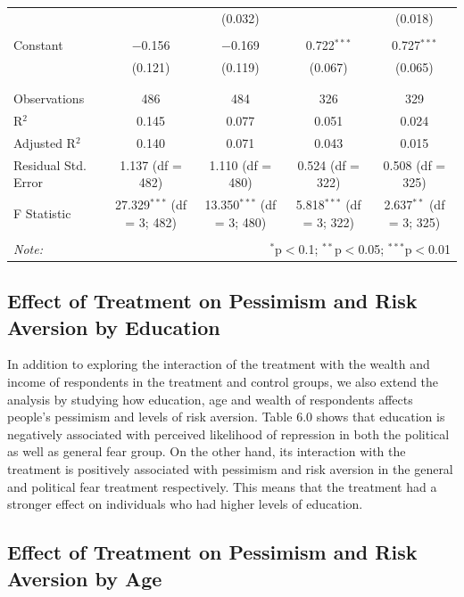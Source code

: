 \documentclass{article}
\begin{document}
\begin{table}[!htbp]
\begin{tabular}{@{\extracolsep{5pt}}lcccc}
  &  & (0.032) &  & (0.018) \\ 
  & & & & \\ 
 Constant & $-$0.156 & $-$0.169 & 0.722$^{***}$ & 0.727$^{***}$ \\ 
  & (0.121) & (0.119) & (0.067) & (0.065) \\ 
  & & & & \\ 
\hline \\[-1.8ex] 
Observations & 486 & 484 & 326 & 329 \\ 
R$^{2}$ & 0.145 & 0.077 & 0.051 & 0.024 \\ 
Adjusted R$^{2}$ & 0.140 & 0.071 & 0.043 & 0.015 \\ 
Residual Std. Error & 1.137 (df = 482) & 1.110 (df = 480) & 0.524 (df = 322) & 0.508 (df = 325) \\ 
F Statistic & 27.329$^{***}$ (df = 3; 482) & 13.350$^{***}$ (df = 3; 480) & 5.818$^{***}$ (df = 3; 322) & 2.637$^{**}$ (df = 3; 325) \\ 
\hline 
\hline \\[-1.8ex] 
\textit{Note:}  & \multicolumn{4}{r}{$^{*}$p$<$0.1; $^{**}$p$<$0.05; $^{***}$p$<$0.01} \\ 
\end{tabular} 
\end{table} 

\subsection{Effect of Treatment on Pessimism and Risk Aversion by Education}

In addition to exploring the interaction of the treatment with the wealth and income of respondents in the treatment and control groups, we also extend the analysis by studying how education, age and wealth of respondents affects people's pessimism and levels of risk aversion. Table 6.0 shows that education is negatively associated with perceived likelihood of repression in both the political as well as general fear group. On the other hand, its interaction with the treatment is positively associated with pessimism and risk aversion in the general and political fear treatment respectively. This means that the treatment had a stronger effect on individuals who had higher levels of education. 

\subsection{Effect of Treatment on Pessimism and Risk Aversion by Age}
\end{document}

